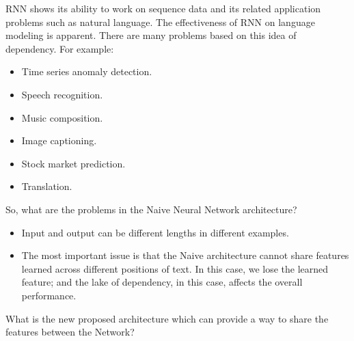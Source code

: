 RNN shows its ability to work on sequence data and its related application problems such as natural language\cite{Mikolov_et_al}. The effectiveness of RNN on language modeling is apparent. There are many problems based on this idea of dependency. For example:
\begin{itemize}
\item Time series anomaly detection.
\item Speech recognition.
\item Music composition.
\item Image captioning.
\item Stock market prediction.
\item Translation.
\end{itemize}
So, what are the problems in the Naive Neural Network architecture?
\begin{itemize}
\item Input and output can be different lengths in different examples.
\item The most important issue is that the Naive architecture cannot share features learned across different positions of text. In this case, we lose the learned feature; and the lake of dependency, in this case, affects the overall performance.
\end{itemize}
What is the new proposed architecture which can provide a way to share the features between the Network?
